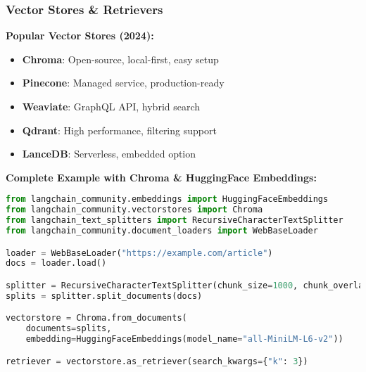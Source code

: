 \begin{frame}[fragile]\frametitle{Vector Stores \& Retrievers}

\textbf{Popular Vector Stores (2024):}
\begin{itemize}
\item \textbf{Chroma}: Open-source, local-first, easy setup
\item \textbf{Pinecone}: Managed service, production-ready
\item \textbf{Weaviate}: GraphQL API, hybrid search
\item \textbf{Qdrant}: High performance, filtering support
\item \textbf{LanceDB}: Serverless, embedded option
\end{itemize}

\textbf{Complete Example with Chroma & HuggingFace Embeddings:}
\begin{lstlisting}[language=python, basicstyle=\tiny]
from langchain_community.embeddings import HuggingFaceEmbeddings
from langchain_community.vectorstores import Chroma
from langchain_text_splitters import RecursiveCharacterTextSplitter
from langchain_community.document_loaders import WebBaseLoader

loader = WebBaseLoader("https://example.com/article")
docs = loader.load()

splitter = RecursiveCharacterTextSplitter(chunk_size=1000, chunk_overlap=200)
splits = splitter.split_documents(docs)

vectorstore = Chroma.from_documents(
    documents=splits,
    embedding=HuggingFaceEmbeddings(model_name="all-MiniLM-L6-v2"))

retriever = vectorstore.as_retriever(search_kwargs={"k": 3})
\end{lstlisting}

\end{frame}

